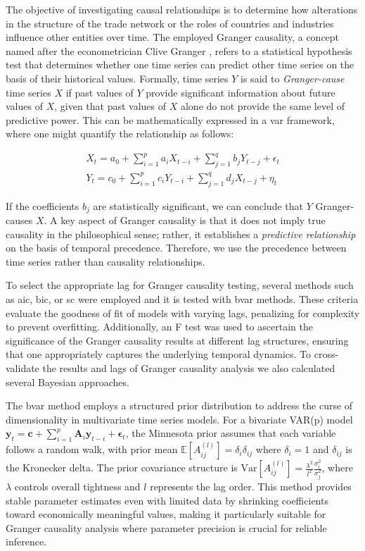 \documentclass[preprint, 3p,
authoryear]{elsarticle} %
\begin{document}
The objective of investigating causal relationships is to determine how
alterations in the structure of the trade network or the roles of
countries and industries influence other entities over time. The
employed Granger causality, a concept named after the econometrician
Clive Granger \citep{granger1969investigating}, refers to a statistical
hypothesis test that determines whether one time series can predict
other time series on the basis of their historical values. Formally,
time series \(Y\) is said to \emph{Granger-cause} time series \(X\) if
past values of \(Y\) provide significant information about future values
of \(X\), given that past values of \(X\) alone do not provide the same
level of predictive power. This can be mathematically expressed in a
\gls{var} framework, where one might quantify the relationship as
follows:

\begin{eqnarray}
X_t = a_0 + \sum_{i=1}^{p} a_i X_{t-i} + \sum_{j=1}^{q} b_j Y_{t-j} + \epsilon_t\\
Y_t = c_0 + \sum_{i=1}^{p} c_i Y_{t-i} + \sum_{j=1}^{q} d_j X_{t-j} + \eta_t
\end{eqnarray}

If the coefficients \(b_j\) are statistically significant, we can
conclude that \(Y\) Granger-causes \(X\). A key aspect of Granger
causality is that it does not imply true causality in the philosophical
sense; rather, it establishes a \emph{predictive relationship} on the
basis of temporal precedence. Therefore, we use the precedence between
time series rather than causality relationships.

To select the appropriate lag for Granger causality testing, several
methods such as \gls{aic}, \gls{bic}, or \gls{sc} were employed and it
is tested with \gls{bvar} methods. These criteria evaluate the goodness
of fit of models with varying lags, penalizing for complexity to prevent
overfitting. Additionally, an F test was used to ascertain the
significance of the Granger causality results at different lag
structures, ensuring that one appropriately captures the underlying
temporal dynamics. To cross-validate the results and lags of Granger
causality analysis we also calculated several Bayesian approaches.

The \gls{bvar} method employs a structured prior distribution to address
the curse of dimensionality in multivariate time series models. For a
bivariate VAR(p) model
\(\mathbf{y}_t = \mathbf{c} + \sum_{i=1}^{p} \mathbf{A}_i \mathbf{y}_{t-i} + \boldsymbol{\epsilon}_t\),
the Minnesota prior assumes that each variable follows a random walk,
with prior mean \(\mathbb{E}[A_{ij}^{(l)}] = \delta_i \delta_{ij}\)
where \(\delta_i = 1\) and \(\delta_{ij}\) is the Kronecker delta. The
prior covariance structure is
\(\text{Var}[A_{ij}^{(l)}] = \frac{\lambda^2}{l^2} \frac{\sigma_i^2}{\sigma_j^2}\),
where \(\lambda\) controls overall tightness and \(l\) represents the
lag order. This method provides stable parameter estimates even with
limited data by shrinking coefficients toward economically meaningful
values, making it particularly suitable for Granger causality analysis
where parameter precision is crucial for reliable inference.
\end{document}
